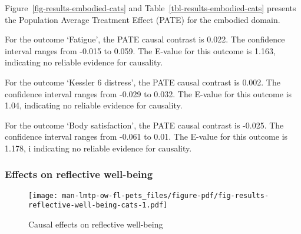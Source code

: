 \documentclass[
  singlecolumn,
  9pt]{article}
\begin{document}
Figure~\ref{fig-results-embodied-cats} and
Table~\ref{tbl-results-embodied-cats} presents the Population Average
Treatment Effect (PATE) for the embodied domain.

For the outcome `Fatigue', the PATE causal contrast is 0.022. The
confidence interval ranges from -0.015 to 0.059. The E-value for this
outcome is 1.163, indicating no reliable evidence for causality.

For the outcome `Kessler 6 distress', the PATE causal contrast is 0.002.
The confidence interval ranges from -0.029 to 0.032. The E-value for
this outcome is 1.04, indicating no reliable evidence for causality.

For the outcome `Body satisfaction', the PATE causal contrast is -0.025.
The confidence interval ranges from -0.061 to 0.01. The E-value for this
outcome is 1.178, i indicating no reliable evidence for causality.

\newpage{}

\subsubsection{Effects on reflective
well-being}\label{effects-on-reflective-well-being}

\begin{figure}

{\centering \texttt{[image: man-lmtp-ow-fl-pets\_files/figure-pdf/fig-results-reflective-well-being-cats-1.pdf]}

}

\caption{\label{fig-results-reflective-well-being-cats}Causal effects on
reflective well-being}

\end{figure}

\newpage{}
\end{document}
